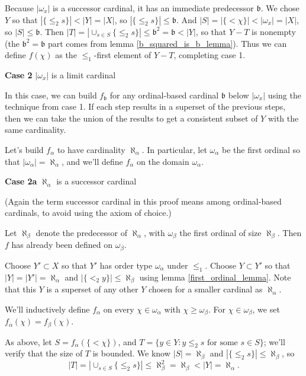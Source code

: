 \documentclass[11pt]{amsart}
\begin{document}
Because $|\omega_x|$ is a successor cardinal, it has an immediate predecessor
$\mathfrak b$.
We chose $Y$ so that $|\{\le_2 s\}| < |Y|=|X|$, so $|\{\le_2 s\}| \le \mathfrak b$.
And $|S| = |\{ < \chi \}| < |\omega_x| = |X|$, so $|S| \le \mathfrak b$.
Then $|T| = |\cup_{s\in S}\{\le_2 s\}| \le \mathfrak b^2 = \mathfrak b < |Y|$,
so that $Y-T$ is nonempty
(the $\mathfrak b^2 = \mathfrak b$ part comes from lemma \ref{b_squared_is_b_lemma}).
Thus we can define $f(\chi )$ as the
$\le_1$-first element of $Y-T$, completing case 1.

{\bf Case 2 } $|\omega_x|$ is a limit cardinal

In this case, we can build $f_\mathfrak b$ for any ordinal-based cardinal $\mathfrak b$ below
$|\omega_x|$ using the technique from case 1. If each step results in a
superset of the previous steps, then we can take the union of the results to
get a consistent subset of $Y$ with the same cardinality.

Let's build $f_\alpha$ to have cardinality $\aleph_\alpha$.
In particular, let $\omega_\alpha$ be the first ordinal so that
$|\omega_\alpha| = \aleph_\alpha$, and we'll define
$f_\alpha$ on the domain $\omega_\alpha$.

{\bf Case 2a} $\aleph_\alpha$ is a successor cardinal

(Again the term successor cardinal in this proof means among
ordinal-based cardinals, to avoid using the axiom of choice.)

Let $\aleph_\beta$ denote the predecessor of $\aleph_\alpha$,
with $\omega_\beta$ the first ordinal of size $\aleph_\beta$.
Then $f$ has already been defined on $\omega_\beta$.

Choose $Y' \subset X$ so that $Y'$ has order type $\omega_\alpha$
under $\le_1$. Choose $Y\subset Y'$ so that $|Y| = |Y'| = \aleph_\alpha$
and $| \{ <_2 y \} | \le \aleph_\beta$ using lemma \ref{first_ordinal_lemma}.
Note that this $Y$ is a superset of any other $Y$ chosen for a smaller cardinal
as $\aleph_\alpha$.

We'll inductively define $f_\alpha$ on every $\chi \in \omega_\alpha$ with $\chi \ge \omega_\beta$.
For $\chi \in \omega_\beta$, we set $f_\alpha(\chi) = f_\beta(\chi)$.

As above, let $S = f_\alpha( \{ < \chi \} )$,
and $ T = \{ y \in Y : y \le_2 s \text{ for some } s \in S \}$; we'll verify that the size of $T$ is bounded.
We know $|S| = \aleph_\beta$ and $|\{ \le_2 s \} | \le \aleph_\beta$, so
$$ |T| = \left|\cup_{s\in S} \{ \le_2 s \}\right| \le \aleph_\beta^2 = \aleph_\beta < |Y| = \aleph_\alpha. $$
\end{document}
